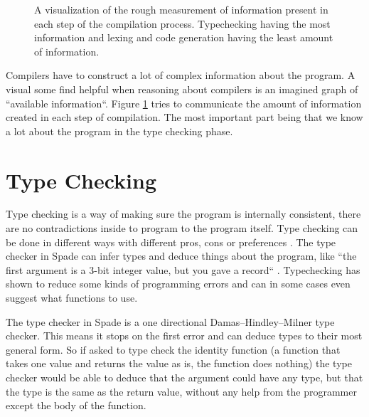 \documentclass[msc,lith,english]{liuthesis}
\begin{document}
\begin{figure}
\begin{center}
  \caption{A visualization of the rough measurement of information present in each step of the compilation process. Typechecking having the most information and lexing and code generation having the least amount of information.}
  \label{fig:InformationCompilation}
\end{center}
\end{figure}

Compilers have to construct a lot of complex information about the program. A visual some find helpful when reasoning about compilers is an imagined graph of ``available information``. Figure \ref{fig:InformationCompilation} tries to communicate the amount of information created in each step of compilation. The most important part being that we know a lot about the program in the type checking phase.


\section{Type Checking} %
\label{sec:TypeChecking}
Type checking is a way of making sure the program is internally consistent, there are no contradictions inside to program to the program itself. Type checking can be done in different ways with different pros, cons or preferences \cite{src:TypeCheckersBook}. The type checker in Spade can infer types and deduce things about the program, like ``the first argument is a 3-bit integer value, but you gave a record`` \cite{src:spadeAnHDL}. Typechecking has shown to reduce some kinds of programming errors and can in some cases even suggest what functions to use.

The type checker in Spade is a one directional Damas–Hindley–Milner type checker. This means it stops on the first error and can deduce types to their most general form. So if asked to type check the identity function (a function that takes one value and returns the value as is, the function does nothing) the type checker would be able to deduce that the argument could have any type, but that the type is the same as the return value, without any help from the programmer except the body of the function. \cite{src:DamasHindleyMilner}
\end{document}
